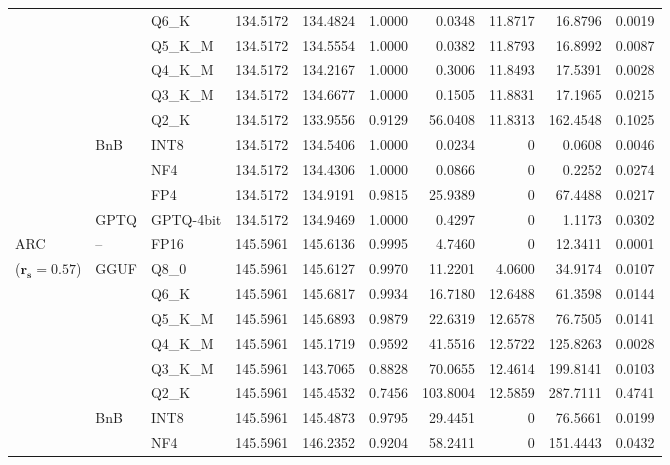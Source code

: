 \begin{longtable}{ll l rrrrrrr}
 &  & Q6\_K & 134.5172 & 134.4824 & 1.0000 & 0.0348 & 11.8717 & 16.8796 & 0.0019 \\
 &  & Q5\_K\_M & 134.5172 & 134.5554 & 1.0000 & 0.0382 & 11.8793 & 16.8992 & 0.0087 \\
 &  & Q4\_K\_M & 134.5172 & 134.2167 & 1.0000 & 0.3006 & 11.8493 & 17.5391 & 0.0028 \\
 &  & Q3\_K\_M & 134.5172 & 134.6677 & 1.0000 & 0.1505 & 11.8831 & 17.1965 & 0.0215 \\
 &  & Q2\_K & 134.5172 & 133.9556 & \cellcolor{red!18} 0.9129 & \cellcolor{red!18} 56.0408 & 11.8313 & \cellcolor{red!18} 162.4548 & \cellcolor{red!18} 0.1025 \\
 & BnB & INT8 & 134.5172 & 134.5406 & 1.0000 & 0.0234 & \cellcolor{cyan!12} $0$ & 0.0608 & 0.0046 \\
 &  & NF4 & 134.5172 & 134.4306 & 1.0000 & 0.0866 & \cellcolor{cyan!12} $0$ & 0.2252 & 0.0274 \\
 &  & FP4 & 134.5172 & 134.9191 & 0.9815 & 25.9389 & \cellcolor{cyan!12} $0$ & 67.4488 & 0.0217 \\
 & GPTQ & GPTQ-4bit & 134.5172 & 134.9469 & 1.0000 & 0.4297 & \cellcolor{cyan!12} $0$ & 1.1173 & 0.0302 \\
\midrule
ARC & -- & FP16 & 145.5961 & 145.6136 & 0.9995 & 4.7460 & \cellcolor{cyan!12} $0$ & 12.3411 & 0.0001 \\
{\small ($\mathbf{r_s{=}0.57}$)} & GGUF & Q8\_0 & 145.5961 & 145.6127 & 0.9970 & 11.2201 & 4.0600 & 34.9174 & 0.0107 \\
 &  & Q6\_K & 145.5961 & 145.6817 & 0.9934 & 16.7180 & 12.6488 & 61.3598 & 0.0144 \\
 &  & Q5\_K\_M & 145.5961 & 145.6893 & 0.9879 & 22.6319 & 12.6578 & 76.7505 & 0.0141 \\
 &  & Q4\_K\_M & 145.5961 & 145.1719 & 0.9592 & 41.5516 & 12.5722 & 125.8263 & 0.0028 \\
 &  & Q3\_K\_M & 145.5961 & 143.7065 & \cellcolor{red!18} 0.8828 & \cellcolor{red!18} 70.0655 & 12.4614 & \cellcolor{red!18} 199.8141 & \cellcolor{red!18} 0.0103 \\
 &  & Q2\_K & 145.5961 & 145.4532 & \cellcolor{red!35} 0.7456 & \cellcolor{red!35} 103.8004 & 12.5859 & \cellcolor{red!35} 287.7111 & \cellcolor{red!35} 0.4741 \\
 & BnB & INT8 & 145.5961 & 145.4873 & 0.9795 & 29.4451 & \cellcolor{cyan!12} $0$ & 76.5661 & 0.0199 \\
 &  & NF4 & 145.5961 & 146.2352 & \cellcolor{red!18} 0.9204 & \cellcolor{red!18} 58.2411 & \cellcolor{cyan!12} $0$ & \cellcolor{red!18} 151.4443 & \cellcolor{red!18} 0.0432 \\

\end{longtable}
